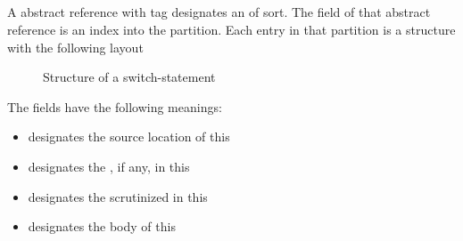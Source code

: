 

\subsection{}
\label{sec:ifc:StmtSort:Switch}

A  abstract reference with tag  designates an  of  sort.
The  field of that abstract reference is an index into the  partition.
Each entry in that partition is a structure with the following layout
%
\begin{figure}[H]
	\centering
	\caption{Structure of a switch-statement}
	\label{fig:ifc-switch-stmt-structure}
\end{figure}

The fields have the following meanings:
\begin{itemize}
	\item {} designates the source location of this 
	\item {} designates the , if any, in this 
	\item {} designates the  scrutinized in this 
	\item {} designates the body of this 
\end{itemize}


\subsection{}
\label{sec:ifc:StmtSort:DoWhile}

